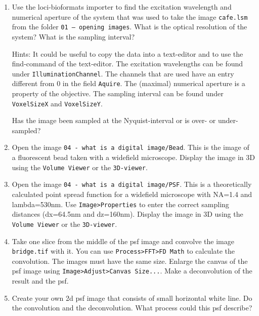 \begin{enumerate}
\item Use the loci-bioformats importer to find the excitation wavelength and numerical aperture of the system that was used to take the image \texttt{cafe.lsm} from the folder \texttt{01 – opening images}. What is the optical resolution of the system? What is the sampling interval?

Hints: It could be useful to copy the data into a text-editor and to use the find-command of
the text-editor. The excitation wavelengths can be found under \texttt{IlluminationChannel}. The
channels that are used have an entry different from 0 in the field \texttt{Aquire}. The (maximal)
numerical aperture is a property of the objective. The sampling interval can be found under
\texttt{VoxelSizeX} and \texttt{VoxelSizeY}.

Has the image been sampled at the Nyquist-interval or is over- or under-sampled?

\item Open the image \texttt{04 - what is a digital image/Bead}. This is the image of a fluorescent bead taken with a widefield microscope. Display the image in 3D using the \texttt{Volume Viewer} or the \texttt{3D-viewer}.

\item Open the image \texttt{04 - what is a digital image/PSF}. This is a theoretically calculated point spread function for a widefield microscope with NA=1.4 and lambda=530nm. Use \texttt{Image>Properties} to enter the correct sampling distances (dx=64.5nm and dz=160nm). Display the image in 3D using the \texttt{Volume Viewer} or the \texttt{3D-viewer}.

\item Take one slice from the middle of the psf image and convolve the image \texttt{bridge.tif} with it. You can use \texttt{Process>FFT>FD Math} to calculate the convolution. The images must have the same size. Enlarge the canvas of the psf image using \texttt{Image>Adjust>Canvas Size...}. Make a deconvolution of the result and the psf.

\item Create your own 2d psf image that consists of small horizontal white line. Do the convolution and the deconvolution. What process could this psf describe?

\fbox{
	\begin{minipage}{\linewidth}
		\hfill\vspace{2cm}
	\end{minipage}
	}
\end{enumerate}

